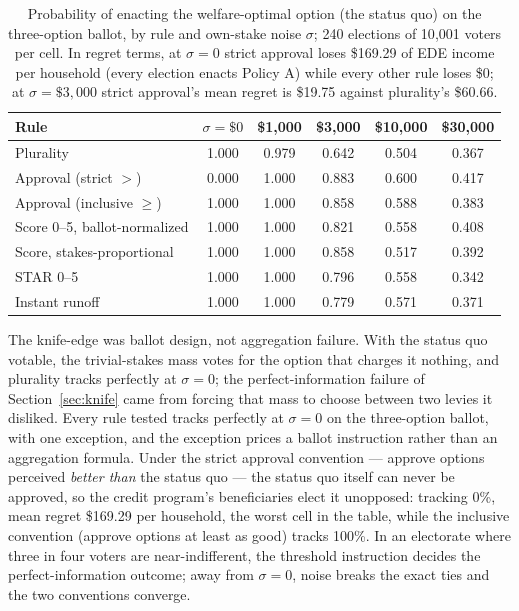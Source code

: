 \documentclass[11pt]{article}
\begin{document}
\begin{table}[t]
\centering
\small
\begin{tabular}{lccccc}
\toprule
Rule & \(\sigma = \$0\) & \$1{,}000 & \$3{,}000 & \$10{,}000 & \$30{,}000 \\
\midrule
Plurality & 1.000 & 0.979 & 0.642 & 0.504 & 0.367 \\
Approval (strict \(>\)) & 0.000 & 1.000 & 0.883 & 0.600 & 0.417 \\
Approval (inclusive \(\ge\)) & 1.000 & 1.000 & 0.858 & 0.588 & 0.383 \\
Score 0--5, ballot-normalized & 1.000 & 1.000 & 0.821 & 0.558 & 0.408 \\
Score, stakes-proportional & 1.000 & 1.000 & 0.858 & 0.517 & 0.392 \\
STAR 0--5 & 1.000 & 1.000 & 0.796 & 0.558 & 0.342 \\
Instant runoff & 1.000 & 1.000 & 0.779 & 0.571 & 0.371 \\
\bottomrule
\end{tabular}
\caption{Probability of enacting the welfare-optimal option (the status
quo) on the three-option ballot, by rule and own-stake noise \(\sigma\);
240 elections of 10{,}001 voters per cell. In regret terms, at
\(\sigma = 0\) strict approval loses \$169.29 of EDE income per
household (every election enacts Policy A) while every other rule loses
\$0; at \(\sigma = \$3{,}000\) strict approval's mean regret is \$19.75
against plurality's \$60.66.}
\label{tab:rules}
\end{table}

The knife-edge was ballot design, not aggregation failure. With the
status quo votable, the trivial-stakes mass votes for the option that
charges it nothing, and plurality tracks perfectly at \(\sigma = 0\);
the perfect-information failure of Section~\ref{sec:knife} came from
forcing that mass to choose between two levies it disliked. Every rule
tested tracks perfectly at \(\sigma = 0\) on the three-option ballot,
with one exception, and the exception prices a ballot instruction
rather than an aggregation formula. Under the strict approval
convention --- approve options perceived \emph{better than} the status
quo --- the status quo itself can never be approved, so the credit
program's beneficiaries elect it unopposed: tracking 0\%, mean regret
\$169.29 per household, the worst cell in the table, while the
inclusive convention (approve options at least as good) tracks 100\%.
In an electorate where three in four voters are near-indifferent, the
threshold instruction decides the perfect-information outcome; away
from \(\sigma = 0\), noise breaks the exact ties and the two
conventions converge.
\end{document}
